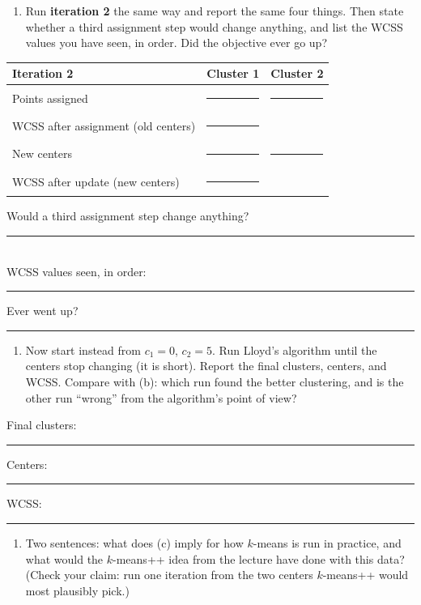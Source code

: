\documentclass[
  11pt,
]{article}
\newcounter{none} %
\providecommand{\tightlist}{%
  \setlength{\itemsep}{0pt}\setlength{\parskip}{0pt}}
\newcommand{\answerspace}[1]{\par\vspace*{#1}}  %
\newcommand{\blank}[1][1.2in]{\rule{#1}{0.4pt}}
\begin{document}
\answerspace{2.5in}

\begin{enumerate}
\def\labelenumi{(\alph{enumi})}
\setcounter{enumi}{1}
\tightlist
\item
  Run \textbf{iteration 2} the same way and report the same four things.
  Then state whether a third assignment step would change anything, and
  list the WCSS values you have seen, in order. Did the objective ever
  go up?
\end{enumerate}

{\def\LTcaptype{none} %
\begin{longtable}[]{@{}lll@{}}
\toprule\noalign{}
Iteration 2 & Cluster 1 & Cluster 2 \\
\midrule\noalign{}
\endhead
\bottomrule\noalign{}
\endlastfoot
Points assigned & \blank[1.6in] & \blank[1.6in] \\
WCSS after assignment (old centers) & \blank[1.6in] & \\
New centers & \blank[1.6in] & \blank[1.6in] \\
WCSS after update (new centers) & \blank[1.6in] & \\
\end{longtable}
}

Would a third assignment step change anything? \blank[0.8in]\\
WCSS values seen, in order: \blank[2.5in]\quad Ever went up?
\blank[0.8in]

\answerspace{2.5in}

\begin{enumerate}
\def\labelenumi{(\alph{enumi})}
\setcounter{enumi}{2}
\tightlist
\item
  Now start instead from \(c_1 = 0\), \(c_2 = 5\). Run Lloyd's algorithm
  until the centers stop changing (it is short). Report the final
  clusters, centers, and WCSS. Compare with (b): which run found the
  better clustering, and is the other run ``wrong'' from the algorithm's
  point of view?
\end{enumerate}

Final clusters: \blank[2.2in] Centers: \blank[1.2in] WCSS: \blank[0.8in]

\answerspace{3in}

\begin{enumerate}
\def\labelenumi{(\alph{enumi})}
\setcounter{enumi}{3}
\tightlist
\item
  Two sentences: what does (c) imply for how \(k\)-means is run in
  practice, and what would the \(k\)-means++ idea from the lecture have
  done with this data? (Check your claim: run one iteration from the two
  centers \(k\)-means++ would most plausibly pick.)
\end{enumerate}
\end{document}
